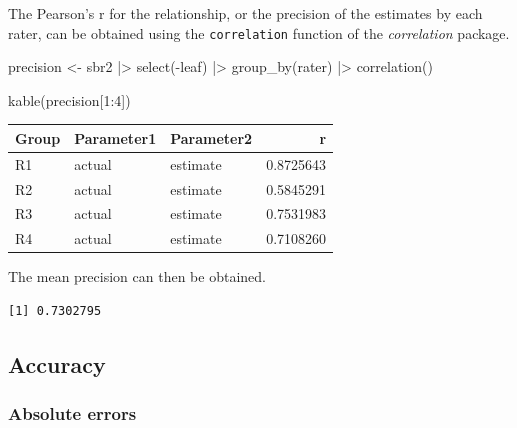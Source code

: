 \documentclass[
  letterpaper,
  DIV=11,
  numbers=noendperiod]{scrreprt}
\newenvironment{Shaded}{\begin{snugshade}}{\end{snugshade}}
\newcommand{\DecValTok}[1]{\textcolor[rgb]{0.68,0.00,0.00}{#1}}
\newcommand{\FunctionTok}[1]{\textcolor[rgb]{0.28,0.35,0.67}{#1}}
\newcommand{\NormalTok}[1]{\textcolor[rgb]{0.00,0.23,0.31}{#1}}
\newcommand{\OtherTok}[1]{\textcolor[rgb]{0.00,0.23,0.31}{#1}}
\newcommand{\SpecialCharTok}[1]{\textcolor[rgb]{0.37,0.37,0.37}{#1}}
\begin{document}
The Pearson's r for the relationship, or the precision of the estimates
by each rater, can be obtained using the \texttt{correlation} function
of the \emph{correlation} package.

\begin{Shaded}
\begin{Highlighting}[]
\NormalTok{precision }\OtherTok{\textless{}{-}}\NormalTok{ sbr2 }\SpecialCharTok{|\textgreater{}} 
  \FunctionTok{select}\NormalTok{(}\SpecialCharTok{{-}}\NormalTok{leaf) }\SpecialCharTok{|\textgreater{}} 
  \FunctionTok{group\_by}\NormalTok{(rater) }\SpecialCharTok{|\textgreater{}} 
  \FunctionTok{correlation}\NormalTok{() }

\FunctionTok{kable}\NormalTok{(precision[}\DecValTok{1}\SpecialCharTok{:}\DecValTok{4}\NormalTok{])}
\end{Highlighting}
\end{Shaded}

\begin{longtable}[]{@{}lllr@{}}
\toprule()
Group & Parameter1 & Parameter2 & r \\
\midrule()
\endhead
R1 & actual & estimate & 0.8725643 \\
R2 & actual & estimate & 0.5845291 \\
R3 & actual & estimate & 0.7531983 \\
R4 & actual & estimate & 0.7108260 \\
\bottomrule()
\end{longtable}

The mean precision can then be obtained.

\begin{Shaded}
\end{Shaded}

\begin{verbatim}
[1] 0.7302795
\end{verbatim}

\hypertarget{accuracy}{%
\subsection{Accuracy}\label{accuracy}}

\hypertarget{absolute-errors}{%
\subsubsection{Absolute errors}\label{absolute-errors}}
\end{document}
